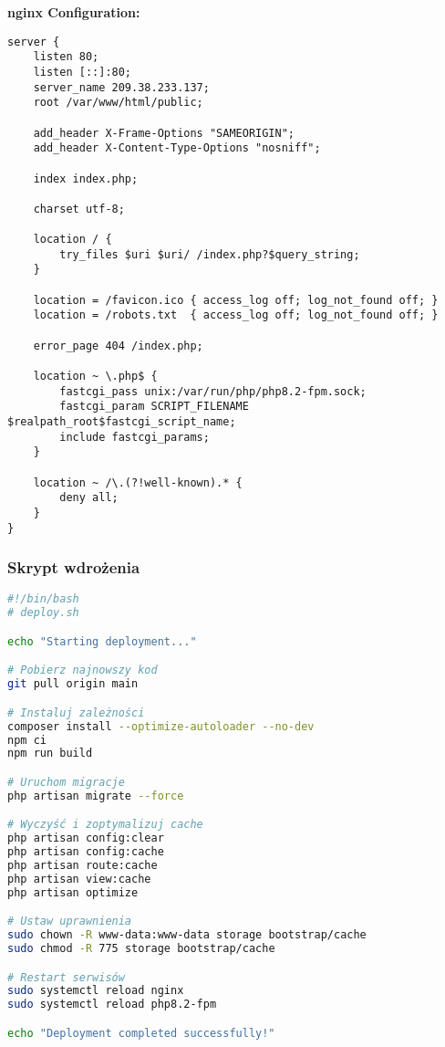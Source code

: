 \documentclass[12pt,a4paper]{article}
\begin{document}
    \textbf{nginx Configuration:}
    \begin{lstlisting}[language=nginx, caption=Konfiguracja nginx dla aplikacji]
server {
    listen 80;
    listen [::]:80;
    server_name 209.38.233.137;
    root /var/www/html/public;

    add_header X-Frame-Options "SAMEORIGIN";
    add_header X-Content-Type-Options "nosniff";

    index index.php;

    charset utf-8;

    location / {
        try_files $uri $uri/ /index.php?$query_string;
    }

    location = /favicon.ico { access_log off; log_not_found off; }
    location = /robots.txt  { access_log off; log_not_found off; }

    error_page 404 /index.php;

    location ~ \.php$ {
        fastcgi_pass unix:/var/run/php/php8.2-fpm.sock;
        fastcgi_param SCRIPT_FILENAME $realpath_root$fastcgi_script_name;
        include fastcgi_params;
    }

    location ~ /\.(?!well-known).* {
        deny all;
    }
}
    \end{lstlisting}

    \subsubsection{Skrypt wdrożenia}

    \begin{lstlisting}[language=bash, caption=Automatyczny skrypt deployment]
#!/bin/bash
# deploy.sh

echo "Starting deployment..."

# Pobierz najnowszy kod
git pull origin main

# Instaluj zależności
composer install --optimize-autoloader --no-dev
npm ci
npm run build

# Uruchom migracje
php artisan migrate --force

# Wyczyść i zoptymalizuj cache
php artisan config:clear
php artisan config:cache
php artisan route:cache
php artisan view:cache
php artisan optimize

# Ustaw uprawnienia
sudo chown -R www-data:www-data storage bootstrap/cache
sudo chmod -R 775 storage bootstrap/cache

# Restart serwisów
sudo systemctl reload nginx
sudo systemctl reload php8.2-fpm

echo "Deployment completed successfully!"
    \end{lstlisting}
\end{document}
